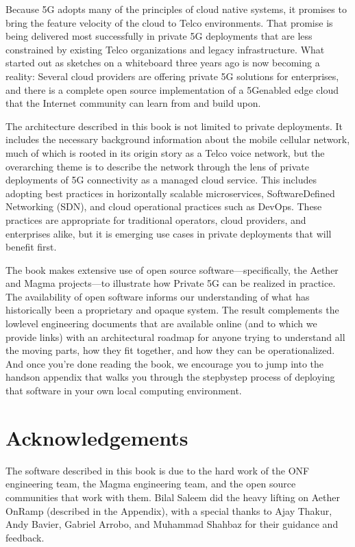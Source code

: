 \documentclass[a4paper,11pt,english]{sphinxmanual}
\begin{document}
\sphinxAtStartPar
Because 5G adopts many of the principles of cloud native systems, it
promises to bring the feature velocity of the cloud to Telco
environments. That promise is being delivered most successfully in
private 5G deployments that are less constrained by existing Telco
organizations and legacy infrastructure. What started out as sketches
on a whiteboard three years ago is now becoming a reality: Several
cloud providers are offering private 5G solutions for enterprises, and
there is a complete open source implementation of a 5G\sphinxhyphen{}enabled edge
cloud that the Internet community can learn from and build upon.

\sphinxAtStartPar
The architecture described in this book is not limited to private
deployments. It includes the necessary background information about
the mobile cellular network, much of which is rooted in its origin
story as a Telco voice network, but the overarching theme is to
describe the network through the lens of private deployments of 5G
connectivity as a managed cloud service. This includes adopting best
practices in horizontally scalable microservices, Software\sphinxhyphen{}Defined
Networking (SDN), and cloud operational practices such as DevOps.
These practices are appropriate for traditional operators, cloud
providers, and enterprises alike, but it is emerging use cases in
private deployments that will benefit first.

\sphinxAtStartPar
The book makes extensive use of open source software—specifically, the
Aether and Magma projects—to illustrate how Private 5G can be realized
in practice. The availability of open software informs our
understanding of what has historically been a proprietary and opaque
system. The result complements the low\sphinxhyphen{}level engineering documents
that are available online (and to which we provide links) with an
architectural roadmap for anyone trying to understand all the moving
parts, how they fit together, and how they can be operationalized.
And once you’re done reading the book, we encourage you to jump into
the hands\sphinxhyphen{}on appendix that walks you through the step\sphinxhyphen{}by\sphinxhyphen{}step process
of deploying that software in your own local computing environment.


\section*{Acknowledgements}
\label{\detokenize{preface:acknowledgements}}
\sphinxAtStartPar
The software described in this book is due to the hard work of the ONF
engineering team, the Magma engineering team, and the open source
communities that work with them. Bilal Saleem did the heavy lifting on
Aether OnRamp (described in the  Appendix), with a
special thanks to Ajay Thakur, Andy Bavier, Gabriel Arrobo, and
Muhammad Shahbaz for their guidance and feedback.
\end{document}
